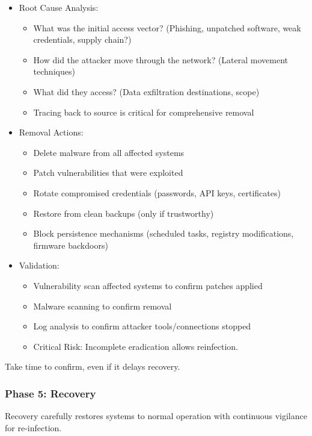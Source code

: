 \documentclass[10pt]{article}
\begin{document}
\begin{itemize}
  \item Root Cause Analysis:
  \begin{itemize}
  	\item What was the initial access vector? (Phishing, unpatched software, weak credentials, supply chain?)
  	\item How did the attacker move through the network? (Lateral movement techniques)
  	\item What did they access? (Data exfiltration destinations, scope)
  	\item Tracing back to source is critical for comprehensive removal
  \end{itemize}
  \item Removal Actions:
  \begin{itemize}
  	\item Delete malware from all affected systems
  	\item Patch vulnerabilities that were exploited
  	\item Rotate compromised credentials (passwords, API keys, certificates)
  	\item Restore from clean backups (only if trustworthy)
  	\item Block persistence mechanisms (scheduled tasks, registry modifications, firmware backdoors)
  \end{itemize}
  \item Validation:
  \begin{itemize}
  	\item Vulnerability scan affected systems to confirm patches applied
  	\item Malware scanning to confirm removal
  	\item Log analysis to confirm attacker tools/connections stopped
  	\item Critical Risk: Incomplete eradication allows reinfection.
  \end{itemize}
\end{itemize}
Take time to confirm, even if it delays recovery.
\subsubsection*{Phase 5: Recovery}
Recovery carefully restores systems to normal operation with continuous vigilance for re-infection.
\end{document}
